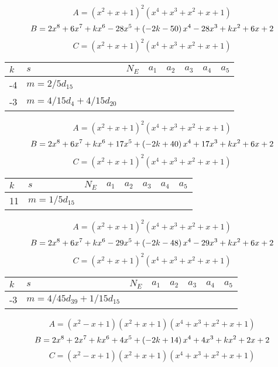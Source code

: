 \documentclass{amsart}
\begin{document}
$$A=(x^2
 + x
 + 1)^{2}(x^4
 + x^3
 + x^2
 + x
 + 1)$$
$$B=2\*x^8
 + 6\*x^7
 + k\*x^6
 - 28\*x^5
 + \left(-2\*k
 - 50\right) \*x^4
 - 28\*x^3
 + k\*x^2
 + 6\*x
 + 2$$
$$C=(x^2
 + x
 + 1)^{2}(x^4
 + x^3
 + x^2
 + x
 + 1)$$
\begin{longtable}{|l|l|l|lllll|}
\hline
$k$ & $s$ & $N_E$ & $a_1$ & $a_2$ & $a_3$ & $a_4$ & $a_5$\\
\hline
-4&$m=2/5d_{15}$&&\multicolumn{5}{c|}{}\\
-3&$m=4/15d_{4}+4/15d_{20}$&&\multicolumn{5}{c|}{}\\
\hline
\end{longtable}
$$A=(x^2
 + x
 + 1)^{2}(x^4
 + x^3
 + x^2
 + x
 + 1)$$
$$B=2\*x^8
 + 6\*x^7
 + k\*x^6
 + 17\*x^5
 + \left(-2\*k
 + 40\right) \*x^4
 + 17\*x^3
 + k\*x^2
 + 6\*x
 + 2$$
$$C=(x^2
 + x
 + 1)^{2}(x^4
 + x^3
 + x^2
 + x
 + 1)$$
\begin{longtable}{|l|l|l|lllll|}
\hline
$k$ & $s$ & $N_E$ & $a_1$ & $a_2$ & $a_3$ & $a_4$ & $a_5$\\
\hline
11&$m=1/5d_{15}$&&\multicolumn{5}{c|}{}\\
\hline
\end{longtable}
$$A=(x^2
 + x
 + 1)^{2}(x^4
 + x^3
 + x^2
 + x
 + 1)$$
$$B=2\*x^8
 + 6\*x^7
 + k\*x^6
 - 29\*x^5
 + \left(-2\*k
 - 48\right) \*x^4
 - 29\*x^3
 + k\*x^2
 + 6\*x
 + 2$$
$$C=(x^2
 + x
 + 1)^{2}(x^4
 + x^3
 + x^2
 + x
 + 1)$$
\begin{longtable}{|l|l|l|lllll|}
\hline
$k$ & $s$ & $N_E$ & $a_1$ & $a_2$ & $a_3$ & $a_4$ & $a_5$\\
\hline
-3&$m=4/45d_{39}+1/15d_{15}$&&\multicolumn{5}{c|}{}\\
\hline
\end{longtable}
$$A=(x^2
 - x
 + 1)(x^2
 + x
 + 1)(x^4
 + x^3
 + x^2
 + x
 + 1)$$
$$B=2\*x^8
 + 2\*x^7
 + k\*x^6
 + 4\*x^5
 + \left(-2\*k
 + 14\right) \*x^4
 + 4\*x^3
 + k\*x^2
 + 2\*x
 + 2$$
$$C=(x^2
 - x
 + 1)(x^2
 + x
 + 1)(x^4
 + x^3
 + x^2
 + x
 + 1)$$
\end{document}
